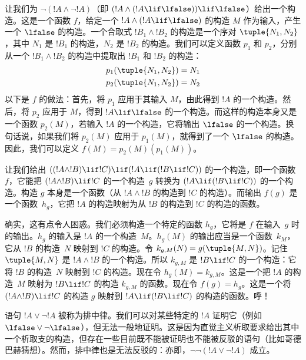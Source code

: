 \documentclass[../../../include/open-logic-section]{subfiles}
\begin{document}
\begin{ex}
让我们为 $\lnot(!A \land \lnot !A)$（即 $(!A
\land (!A \lif \lfalse)) \lif \lfalse$）给出一个构造。这是一个函数 $f$，给定一个 $!A \land (!A \lif \lfalse)$ 的构造 $M$ 作为输入，产生一个 $\lfalse$ 的构造。一个合取式 $!B_1 \land !B_2$ 的构造是一个序对 $\tuple{N_1, N_2}$，其中 $N_1$ 是 $!B_1$ 的构造，$N_2$ 是 $!B_2$ 的构造。我们可以定义函数 $p_1$ 和 $p_2$，分别从一个 $!B_1 \land !B_2$ 的构造中提取出 $!B_1$ 和 $!B_2$ 的构造：
\begin{align*}
  p_1(\tuple{N_1, N_2}) &= N_1\\
  p_2(\tuple{N_1, N_2}) &= N_2
\end{align*}
以下是 $f$ 的做法：首先，将 $p_1$ 应用于其输入 $M$，由此得到 $!A$ 的一个构造。然后，将 $p_2$ 应用于 $M$，得到 $!A \lif \lfalse$ 的一个构造。而这样的构造本身又是一个函数 $p_2(M)$，若输入 $!A$ 的一个构造，它将输出 $\lfalse$ 的一个构造。换句话说，如果我们将 $p_2(M)$ 应用于 $p_1(M)$，就得到了一个 $\lfalse$ 的构造。因此，我们可以定义 $f(M) = p_2(M)(p_1(M))$。
\end{ex}

\begin{ex}
让我们给出 $((!A \land !B) \lif !C) \lif (!A \lif
(!B \lif !C))$ 的一个构造，即一个函数 $f$，它能把 $(!A \land !B) \lif !C$ 的一个构造~$g$ 转换为 $(!A \lif (!B \lif
!C))$ 的一个构造。构造 $g$ 本身是一个函数（从 $!A \land !B$ 的构造到 $!C$ 的构造）。而输出 $f(g)$ 是一个函数~$h_g$，它把 $!A$ 的构造映射为从 $!B$ 的构造到 $!C$ 的构造的函数。

确实，这有点令人困惑。我们必须构造一个特定的函数 $h_g$，它将是 $f$ 在输入~$g$ 时的输出。$h_g$ 的输入是 $!A$ 的一个构造~$M$。$h_g(M)$ 的输出应当是一个函数~$k_M$，它从 $!B$ 的构造~$N$ 映射到 $!C$ 的构造。令 $k_{g,M}(N) = g(\tuple{M, N})$。记住 $\tuple{M, N}$ 是 $!A \land !B$ 的一个构造。所以 $k_{g,M}$ 是 $!B \lif !C$ 的一个构造：它将 $!B$ 的构造~$N$ 映射到 $!C$ 的构造。现在令 $h_g(M) = k_{g,M}$。这是一个把 $!A$ 的构造~$M$ 映射为 $!B \lif !C$ 的构造 $k_{g,M}$ 的函数。现在令 $f(g) = h_g$。这是一个将 $(!A \land !B) \lif !C$ 的构造 $g$ 映射到 $!A \lif (!B \lif !C)$ 的构造的函数。呼！{}
\end{ex}

语句 $!A \lor \lnot !A$ 被称为排中律。我们可以对某些特定的 $!A$ 证明它（例如 $\lfalse \lor \lnot \lfalse$），但无法一般地证明。这是因为直觉主义析取要求给出其中一个析取支的构造，但存在一些目前既不能被证明也不能被反驳的语句（比如哥德巴赫猜想）。然而，排中律也是无法反驳的：亦即，$\lnot \lnot (!A \lor \lnot !A)$ 成立。
\end{document}
